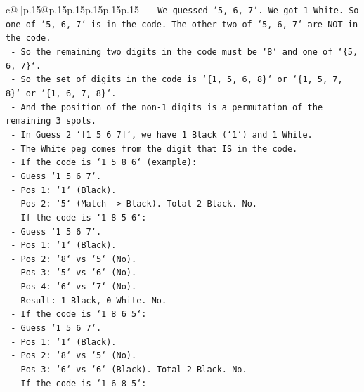 \documentclass{article}
\begin{document}
{\begin{supertabular}{c@{$\;$}|p{.15\linewidth}@{}p{.15\linewidth}p{.15\linewidth}p{.15\linewidth}p{.15\linewidth}p{.15\linewidth}}
{{{\texttt{            {-}   We guessed `5, 6, 7`. We got 1 White. So one of `5, 6, 7` is in the code. The other two of `5, 6, 7` are NOT in the code.} \\
\texttt{            {-}   So the remaining two digits in the code must be `8` and one of `\{5, 6, 7\}`.} \\
\texttt{            {-}   So the set of digits in the code is `\{1, 5, 6, 8\}` or `\{1, 5, 7, 8\}` or `\{1, 6, 7, 8\}`.} \\
\texttt{            {-}   And the position of the non{-}1 digits is a permutation of the remaining 3 spots.} \\
\texttt{            {-}   In Guess 2 `{[}1 5 6 7{]}`, we have 1 Black (`1`) and 1 White.} \\
\texttt{            {-}   The White peg comes from the digit that IS in the code.} \\
\texttt{            {-}   If the code is `1 5 8 6` (example):} \\
\texttt{                {-}   Guess `1 5 6 7`.} \\
\texttt{                {-}   Pos 1: `1` (Black).} \\
\texttt{                {-}   Pos 2: `5` (Match {-}> Black). Total 2 Black. No.} \\
\texttt{            {-}   If the code is `1 8 5 6`:} \\
\texttt{                {-}   Guess `1 5 6 7`.} \\
\texttt{                {-}   Pos 1: `1` (Black).} \\
\texttt{                {-}   Pos 2: `8` vs `5` (No).} \\
\texttt{                {-}   Pos 3: `5` vs `6` (No).} \\
\texttt{                {-}   Pos 4: `6` vs `7` (No).} \\
\texttt{                {-}   Result: 1 Black, 0 White. No.} \\
\texttt{            {-}   If the code is `1 8 6 5`:} \\
\texttt{                {-}   Guess `1 5 6 7`.} \\
\texttt{                {-}   Pos 1: `1` (Black).} \\
\texttt{                {-}   Pos 2: `8` vs `5` (No).} \\
\texttt{                {-}   Pos 3: `6` vs `6` (Black). Total 2 Black. No.} \\
\texttt{            {-}   If the code is `1 6 8 5`:} \\
}}}
\end{supertabular}}
\end{document}
